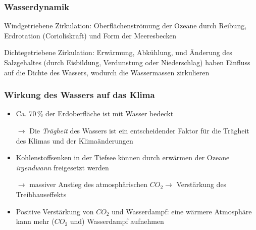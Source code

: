 \begin{frame}
	\frametitle{Wasserdynamik} %
	\begin{block}{Windgetriebene Zirkulation: } %
		Oberflächenströmung der Ozeane durch Reibung, Erdrotation (Corioliskraft) und Form der Meeresbecken 
	\end{block}
	\begin{block}{Dichtegetriebene Zirkulation: }  %
		Erwärmung, Abkühlung, und Änderung des Salzgehaltes (durch Eisbildung, Verdunstung oder Niederschlag) haben Einfluss auf die Dichte des Wassers, wodurch die Wassermassen zirkulieren
	\end{block}
	
\end{frame}


\begin{frame}
	\frametitle{Wirkung des Wassers auf das Klima}
	\begin{itemize}
	\item Ca. 70\,\% der Erdoberfläche ist mit Wasser bedeckt
	\item [$\rightarrow$] Die \textit{Trägheit} des Wassers ist ein entscheidender Faktor für die Trägheit des Klimas und der Klimaänderungen %
	\item Kohlenstoffsenken in der Tiefsee können durch erwärmen der Ozeane \textit{irgendwann} freigesetzt werden
	\item[$\rightarrow$] massiver Anstieg des atmosphärischen $CO_2 \rightarrow$ Verstärkung des Treibhauseffekts
	\item Positive Verstärkung von $CO_2$ und Wasserdampf: eine wärmere Atmosphäre kann mehr ($CO_2$ und) Wasserdampf aufnehmen
	\end{itemize}
\end{frame}

